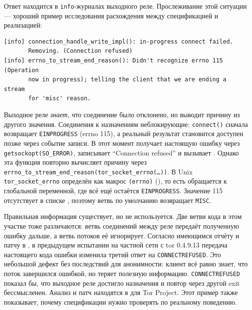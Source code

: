 \begin{approfondimento}
Ответ находится в \texttt{info}-журналах выходного реле. Прослеживание этой ситуации — хороший пример исследования расхождения между спецификацией и реализацией:
\begin{lstlisting}[numbers=none]
[info] connection_handle_write_impl(): in-progress connect failed.
       Removing. (Connection refused)
[info] errno_to_stream_end_reason(): Didn't recognize errno 115 (Operation
       now in progress); telling the client that we are ending a stream
       for 'misc' reason.
\end{lstlisting}
Выходное реле \emph{знает}, что соединение было отклонено, но выводит причину из другого значения. Соединения к назначениям неблокирующие: \texttt{connect()} сначала возвращает \texttt{EINPROGRESS} (errno 115), а реальный результат становится доступен позже через событие записи. В этот момент  получает настоящую ошибку через \texttt{getsockopt(SO\_ERROR)}, записывает \enquote{Connection refused} и вызывает . Однако эта функция повторно вычисляет причину через \texttt{errno\_to\_stream\_end\_reason(tor\_socket\_errno(\ldots))}. В Unix \texttt{tor\_socket\_errno} определён как макрос \texttt{(errno)} (), то есть обращается к глобальной переменной, где всё ещё остаётся \texttt{EINPROGRESS}. Значение 115 отсутствует в списке , поэтому ветвь по умолчанию возвращает \texttt{MISC}.

Правильная информация существует, но не используется. Две ветви кода в этом участке тоже различаются: ветвь соединений между реле передаёт полученную ошибку дальше, а ветвь потоков её игнорирует. Согласно имеющимся отчёту и патчу в , в предыдущем испытании на частной сети с tor 0.4.9.13 передача настоящего кода ошибки изменила третий ответ на \texttt{CONNECTREFUSED}. Это небольшой дефект без последствий для анонимности: клиент всё равно знает, что поток завершился ошибкой, но теряет полезную информацию. \texttt{CONNECTREFUSED} показал бы, что выходное реле достигло назначения и повтор через другой exit бессмысленен. Анализ и патч находятся в  для Tor Project. Этот пример также показывает, почему спецификации нужно проверять по реальному поведению.
\end{approfondimento}

